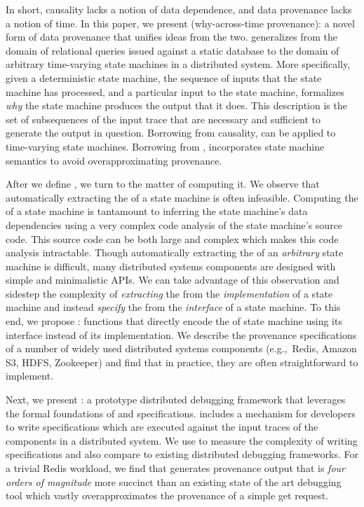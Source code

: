 In short, causality lacks a notion of data dependence, and data provenance
lacks a notion of time. In this paper, we present 
(why-across-time provenance): a novel form of data provenance that unifies
ideas from the two. \Watprovenance{} generalizes \whyprovenance{} from the
domain of relational queries issued against a static database to the domain of
arbitrary time-varying state machines in a distributed system. More
specifically, given a deterministic state machine, the sequence of inputs that
the state machine has processed, and a particular input to the state machine,
\watprovenance{} formalizes \emph{why} the state machine produces the output
that it does. This description is the set of subsequences of the input trace
that are necessary and sufficient to generate the output in question. Borrowing
from causality, \watprovenance{} can be applied to time-varying state machines.
Borrowing from \whyprovenance{}, \watprovenance{} incorporates state machine
semantics to avoid overapproximating provenance.

After we define \watprovenance{}, we turn to the matter of computing it. We
observe that automatically extracting the \watprovenance{} of a state machine
is often infeasible. Computing the \watprovenance{} of a state machine is
tantamount to inferring the state machine's data dependencies using a very
complex code analysis of the state machine's source code. This source code can
be both large and complex which makes this code analysis intractable.
%
Though automatically extracting the \watprovenance{} of an \emph{arbitrary}
state machine is difficult, many distributed systems components are designed
with simple and minimalistic APIs. We can take advantage of this observation
and sidestep the complexity of \emph{extracting} the \watprovenance{} from the
\emph{implementation} of a state machine and instead \emph{specify} the
\watprovenance{} from the \emph{interface} of a state machine. To this end, we
propose : functions that directly
encode the \watprovenance{} of state machine using its interface instead of its
implementation. We describe the provenance specifications of a number of widely
used distributed systems components (e.g.,\ Redis, Amazon S3, HDFS, Zookeeper)
and find that in practice, they are often straightforward to implement.

Next, we present \fluent{}: a prototype distributed debugging framework that
leverages the formal foundations of \watprovenance{} and \watprovenance{}
specifications. \fluent{} includes a mechanism for developers to write
\watprovenance{} specifications which are executed against the input traces of
the components in a distributed system. We use \fluent{} to measure the
complexity of writing \watprovenance{} specifications and also compare
\fluent{} to existing distributed debugging frameworks. For a trivial Redis
workload, we find that \fluent{} generates provenance output that is \emph{four
orders of magnitude} more succinct than an existing state of the art debugging
tool which vastly overapproximates the provenance of a simple get request.

